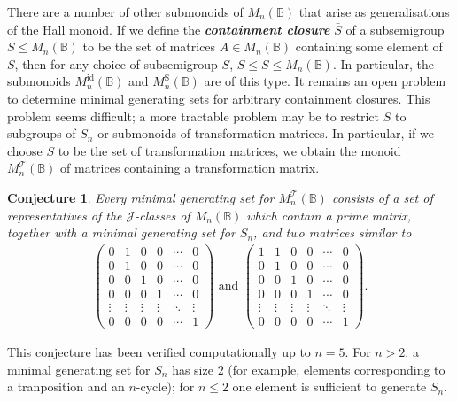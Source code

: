 \documentclass[11pt]{article}
\newtheorem*{conj}{Conjecture}
\newcommand{\defn}[1]{\textbf{\textit{#1}}}
\numberwithin{equation}{section}
\newcommand{\B}{\mathbb{B}}
\newcommand{\Bn}{M_n(\B)}
\newcommand{\Refln}{M_n^{\text{id}}(\B)}
\newcommand{\Halln}{M_n^{\text{S}}(\B)}
\newcommand{\MTn}{M_n^{\mathcal{T}}(\B)}
\newcommand{\J}{\mathscr{J}}
\begin{document}
There are a number of other submonoids of $\Bn$ that arise as generalisations of
the Hall monoid. If we define the \defn{containment closure} $\bar{S}$ of a
subsemigroup $S \leq \Bn$ to be the set of matrices $A \in \Bn$ containing some
element of $S$, then for any choice of subsemigroup $S$, $S \leq \bar{S} \leq
\Bn$. In particular, the submonoids $\Refln$ and $\Halln$ are of this
type. It remains an open problem to determine minimal generating sets for
arbitrary containment closures. This problem seems difficult; a more tractable
problem may be to restrict $S$ to subgroups of $S_n$ or submonoids of
transformation matrices. In particular, if we choose $S$ to be the set of
transformation matrices, we obtain the monoid $\MTn$ of matrices containing a
transformation matrix.

\begin{conj}
  Every minimal generating set for $\MTn$ consists of a set of representatives
  of the $\J$-classes of $\Bn$ which contain a prime matrix, together with a
  minimal generating set for $S_n$, and two matrices
  similar to
  \begin{align*}
  \begin{pmatrix}
    0 & 1 & 0 & 0 & \cdots & 0 \\
    0 & 1 & 0 & 0 & \cdots & 0 \\
    0 & 0 & 1 & 0 & \cdots & 0 \\
    0 & 0 & 0 & 1 & \cdots & 0 \\
    \vdots  & \vdots & \vdots & \vdots & \ddots & \vdots\\
    0 & 0 & 0 & 0 & \cdots & 1
  \end{pmatrix}\text{ and } 
  \begin{pmatrix}
    1 & 1 & 0 & 0 & \cdots & 0 \\
    0 & 1 & 0 & 0 & \cdots & 0 \\
    0 & 0 & 1 & 0 & \cdots & 0 \\
    0 & 0 & 0 & 1 & \cdots & 0 \\
    \vdots  & \vdots & \vdots & \vdots & \ddots & \vdots\\
    0 & 0 & 0 & 0 & \cdots & 1
  \end{pmatrix}.
  \end{align*}
\end{conj}
This conjecture has been verified computationally up to $n = 5$. For $n > 2$,
a minimal generating set for $S_n$ has size $2$ (for example, elements
corresponding to a tranposition and an $n$-cycle); for $n \leq 2$ one element is
sufficient to generate $S_n$.
\end{document}
